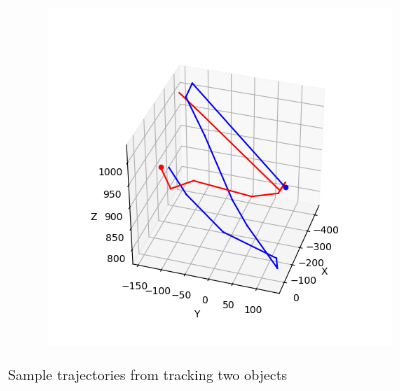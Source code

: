 \begin{figure}
\begin{subfigure}{0.48\linewidth}
	\includegraphics[width=\linewidth]{img/experiments/trajectories2.png}
\end{subfigure}
\caption{Sample trajectories from tracking two objects}
\label{fig:two-trajectories}
\end{figure}
